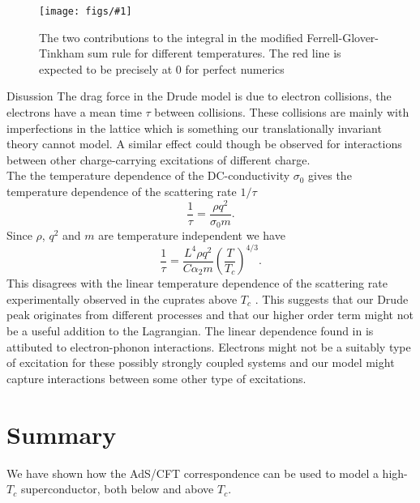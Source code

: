 \documentclass[12pt]{report}
\newcommand{\fig}[3]{
\begin{figure}
\centering
\texttt{[image: figs/\#1]}
\caption{#2}
\end{figure}
}
\begin{document}
\fig{sum_rule_a20.1}{The two contributions to the integral in the modified Ferrell-Glover-Tinkham sum rule for different temperatures. The red line is expected to be precisely at 0 for perfect numerics\label{f:sum2}}

\section{Disussion}
The drag force in the Drude model is due to electron collisions, the electrons have a mean time $\tau$ between collisions. These collisions are mainly with imperfections in the lattice which is something our translationally invariant theory cannot model. A similar effect could though be observed for interactions between other charge-carrying excitations of different charge.\\
The the temperature dependence of the DC-conductivity $\sigma_0$ gives the temperature dependence of the scattering rate $1/\tau$
\begin{equation}
  \frac{1}{\tau}=\frac{\rho q^2}{\sigma_0m}.
\end{equation}
Since $\rho$, $q^2$ and $m$ are temperature independent we have
\begin{equation}
  \frac{1}{\tau}=\frac{L^4\rho q^2}{C\alpha_2m}\left(\frac{T}{T_c}\right)^{4/3}.
\end{equation}
This disagrees with the linear temperature dependence of the scattering rate experimentally observed in the cuprates above $T_c$ \cite{drudeFit}. This suggests that our Drude peak originates from different processes and that our higher order term might not be a useful addition to the Lagrangian. The linear dependence found in \cite{drudeFit} is attibuted to electron-phonon interactions. Electrons might not be a suitably type of excitation for these possibly strongly coupled systems and our model might capture interactions between some other type of excitations.
\chapter{Summary}
We have shown how the AdS/CFT correspondence can be used to model a high-$T_c$ superconductor, both below and above $T_c$.
\end{document}
